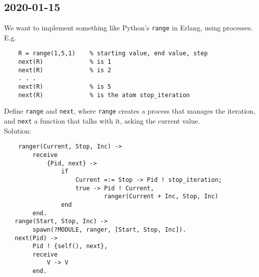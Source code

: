 \subsection{2020-01-15}
We want to implement something like Python's \texttt{range} in Erlang, using processes. \\
E.g. 
\begin{lstlisting}
    R = range(1,5,1)    % starting value, end value, step
    next(R)             % is 1
    next(R)             % is 2
    . . .
    next(R)             % is 5
    next(R)             % is the atom stop_iteration
\end{lstlisting}
Define \texttt{range} and \texttt{next}, where \texttt{range} creates a process that manages the iteration, and \texttt{next} a function that
talks with it, asking the current value. \\
Solution:
\begin{lstlisting}
    ranger(Current, Stop, Inc) ->
        receive
            {Pid, next} ->
                if
                    Current =:= Stop -> Pid ! stop_iteration;
                    true -> Pid ! Current,
                            ranger(Current + Inc, Stop, Inc)
                end 
        end.
   range(Start, Stop, Inc) ->
        spawn(?MODULE, ranger, [Start, Stop, Inc]).
   next(Pid) ->
        Pid ! {self(), next},
        receive
            V -> V
        end.
\end{lstlisting}




